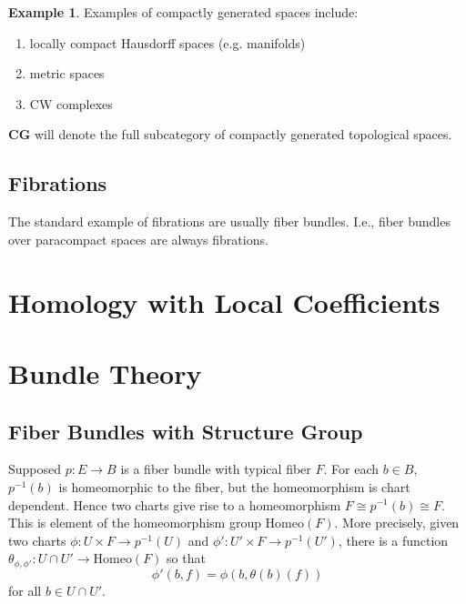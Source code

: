\documentclass{article}
\theoremstyle{definition}
\newtheorem{ex}{Example}[section]
\newcommand{\cat}[1]{\mathbf{#1}}
\begin{document}
    \begin{ex}
    Examples of compactly generated spaces include:
    \begin{enumerate}
    \item locally compact Hausdorff spaces (e.g. manifolds)
    \item metric spaces
    \item CW complexes
    \end{enumerate}
    \end{ex}
 $\cat{CG}$ will denote the full subcategory of compactly generated topological spaces. 
 \subsection{Fibrations}
 The standard example of fibrations are usually fiber bundles. I.e., fiber bundles over paracompact spaces are always fibrations. 
    \section{Homology with Local Coefficients}
    \section{Bundle Theory}
    \subsection{Fiber Bundles with Structure Group}
    Supposed $p:E\rightarrow B$ is a fiber bundle with typical fiber $F$. For each $b\in B$, $p^{-1}(b)$ is homeomorphic to the fiber, but the homeomorphism is chart dependent. Hence two charts give rise to a homeomorphism $F\cong p^{-1}(b)\cong F$. This is element of the homeomorphism group Homeo$(F)$. More precisely, given two charts $\phi:U\times F\rightarrow p^{-1}(U)$ and 
    $\phi':U'\times F\rightarrow p^{-1}(U')$, there is a function $\theta_{\phi,\phi'}:U\cap U'\rightarrow \text{Homeo}(F)$ so that 
    \[\phi'(b,f)=\phi(b,\theta(b)(f))\] for all $b\in U\cap U'.$
\end{document}
